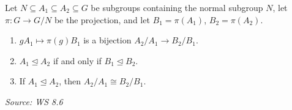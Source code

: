 \documentclass[11pt]{report}
\newcommand{\srcline}[1]{\par\hfill{\footnotesize\textit{Source: #1}}}
\begin{document}
\begin{propbox}\label{prop:quotients-along-correspondence}
Let $N \subseteq A_1 \subseteq A_2 \subseteq G$ be subgroups containing the normal subgroup $N$, let $\pi: G \to G/N$ be the projection, and let $B_1 = \pi(A_1)$, $B_2 = \pi(A_2)$.
\begin{enumerate}
    \item $gA_1 \mapsto \pi(g)B_1$ is a bijection $A_2/A_1 \to B_2/B_1$.
    \item $A_1 \trianglelefteq A_2$ if and only if $B_1 \trianglelefteq B_2$.
    \item If $A_1 \trianglelefteq A_2$, then $A_2/A_1 \cong B_2/B_1$.
\end{enumerate}
\srcline{WS 8.6}
\end{propbox}
\end{document}
